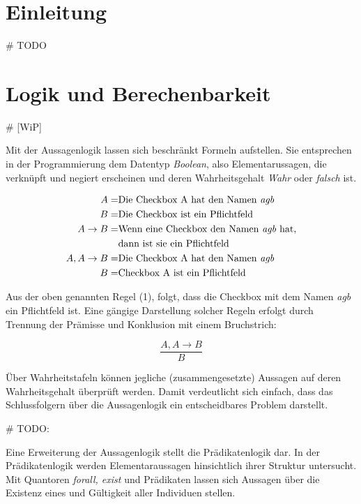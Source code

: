 \documentclass[runningheads,a4paper]{llncs}
\begin{document}
\section{Einleitung}
\# TODO
\newpage
\section{Logik und Berechenbarkeit}

\# [WiP]

Mit der Aussagenlogik lassen sich beschränkt Formeln aufstellen. Sie entsprechen in der Programmierung dem Datentyp \textit{Boolean}, also Elementarussagen, die verknüpft und negiert erscheinen und deren Wahrheitsgehalt \textit{Wahr} oder \textit{falsch} ist.

\begin{align}
\begin{split}
A = & \textnormal{Die Checkbox A hat den Namen \textit{agb}}\\
B = & \textnormal{Die Checkbox ist ein Pflichtfeld}\\
A \to B = & \textnormal{Wenn eine Checkbox den Namen \textit{agb} hat,} \\
& \textnormal{dann ist sie ein Pflichtfeld}\\
A, A \to B = & \textnormal{Die Checkbox A hat den Namen \textit{agb}} \\
B = & \textnormal{Checkbox A ist ein Pflichtfeld}
\end{split}
\end{align}

Aus der oben genannten Regel (1), folgt, dass die Checkbox mit dem Namen \textit{agb} ein Pflichtfeld ist.
Eine gängige Darstellung solcher Regeln erfolgt durch Trennung der Prämisse und Konklusion mit einem Bruchstrich:

\begin{equation}
\frac{A, A \to B}{B}
\end{equation}

Über Wahrheitstafeln können jegliche (zusammengesetzte) Aussagen auf deren Wahrheitsgehalt überprüft werden.
Damit verdeutlicht sich einfach, dass das Schlussfolgern über die Aussagenlogik ein entscheidbares Problem darstellt.

\# TODO:

Eine Erweiterung der Aussagenlogik stellt die Prädikatenlogik dar.
In der Prädikatenlogik werden Elementaraussagen hinsichtlich ihrer Struktur untersucht.
Mit Quantoren \textit{forall, exist} und Prädikaten lassen sich Aussagen über die Existenz eines und Gültigkeit aller Individuen stellen.
\end{document}
